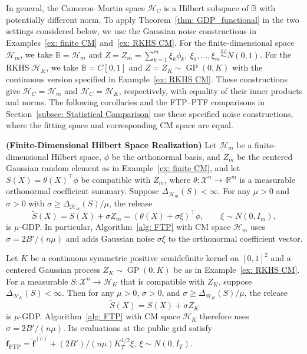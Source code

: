 \documentclass[twoside,11pt]{article}
\newcommand\R{\,{\mathbb{R}}}   %
\begin{document}
In general, the Cameron--Martin space $\mathcal H_C$ is a Hilbert subspace of $\mathbb B$ with potentially different norm. To apply Theorem~\ref{thm: GDP_functional} in the two settings considered below, we use the Gaussian noise constructions in Examples~\ref{ex: finite CM} and~\ref{ex: RKHS CM}. For the finite-dimensional space $\mathcal H_m$, we take $\mathbb B=\mathcal H_m$ and $Z=Z_m = \sum_{k=1}^m\xi_k\phi_k,\ \xi_1,\ldots,\xi_m\overset{\mathrm{iid}}\sim N(0,1)$. For the RKHS $\mathcal H_K$, we take $\mathbb B=C[0,1]$ and $Z=Z_K\sim\operatorname{GP}(0,K)$ with the continuous version specified in Example~\ref{ex: RKHS CM}. These constructions give $\mathcal H_{C}=\mathcal H_m$ and $\mathcal H_{C}=\mathcal H_K$, respectively, with equality of their inner products and norms. The following corollaries and the FTP--PTF comparisons in Section~\ref{subsec: Statistical Comparison} use these specified noise constructions, where the fitting space and corresponding CM space are equal.
\begin{corollary}\textup{\textbf{(Finite-Dimensional Hilbert Space Realization)}}
    Let $\mathcal H_m$ be a finite-dimensional Hilbert space, $\phi$ be the orthonormal basis, and $Z_m$ be the centered Gaussian random element as in Example~\ref{ex: finite CM}, and let $S(X)=\theta(X)^\top\phi$ be compatible with $Z_m$, where $\theta: \mathcal{X}^n\to \R^m$ is a measurable orthonormal coefficient summary. Suppose $\Delta_{\mathcal{H}_m}(S)<\infty$. For any $\mu>0$ and $\sigma>0$ with $\sigma\ge\Delta_{\mathcal{H}_m}(S)/\mu$, the release
    \[
    \widetilde S(X)=S(X)+\sigma Z_m=(\theta(X)+\sigma\xi)^\top\phi,
    \qquad \xi\sim N(0,I_m),
    \]
    is $\mu$-GDP. In particular, Algorithm~\ref{alg: FTP} with CM space $\mathcal H_m$ uses $\sigma=2B'/(n\mu)$ and adds Gaussian noise $\sigma\xi$ to the orthonormal coefficient vector.
    \label{col: finite-dimension functional GDP}
\end{corollary}

\begin{corollary}
\label{col: RKHS GDP}
Let $K$ be a continuous symmetric positive semidefinite kernel on $[0,1]^2$ and a centered Gaussian process $Z_K\sim\operatorname{GP}(0,K)$ be as in Example~\ref{ex: RKHS CM}. For a measurable $S:\mathcal X^n\to\mathcal H_K$ that is compatible with $Z_K$, suppose $\Delta_{\mathcal{H}_K}(S)<\infty$. Then for any $\mu>0$, $\sigma>0$, and $\sigma\ge\Delta_{\mathcal{H}_K}(S)/\mu$, the release
\[
\widetilde S(X) = S(X)+\sigma Z_K
\] 
is $\mu$-GDP. Algorithm~\ref{alg: FTP} with CM space $\mathcal H_K$ therefore uses $\sigma=2B'/(n\mu)$. Its evaluations at the public grid satisfy $\widetilde{\mathbf f}_{\mathrm{FTP}} =\overline{\widehat{\mathbf f}^{(c)}}+(2B')/(n\mu)K_T^{1/2}\xi,\ \xi\sim N(0,I_T).$
\end{corollary}
\end{document}
